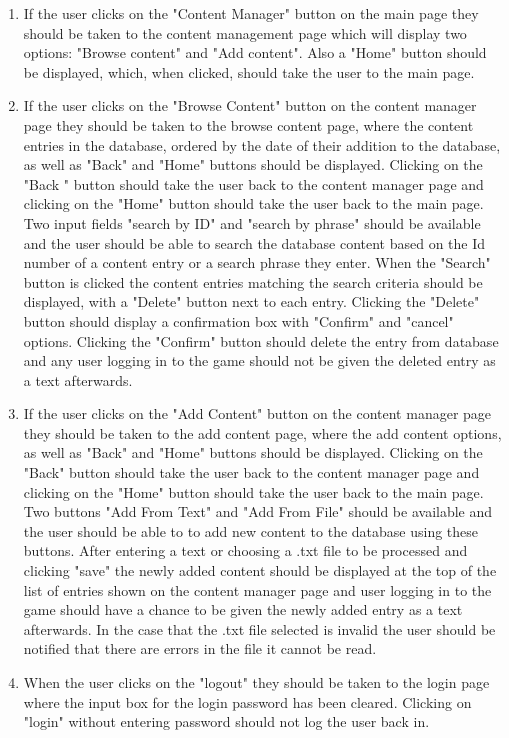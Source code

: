 \documentclass[titlepage]{article}
\begin{document}
\begin{enumerate}
	\item If the user clicks on the "Content Manager" button on the main page they should be taken to the content management page which will display two options: "Browse content" and "Add content". Also a "Home" button should be displayed, which, when clicked, should take the user to the main page.
	\item If the user clicks on the "Browse Content" button on the content manager page they should be taken to the browse content page, where the content entries in the database, ordered by the date of their addition to the database, as well as "Back" and  "Home" buttons should be displayed. Clicking on the "Back " button should take the user back to the content manager page and clicking on the "Home" button should take the user back to the main page. Two input fields "search by ID" and "search by phrase" should be available and the user should be able to search the database content based on the Id number of a content entry or a search phrase they enter. When the "Search" button is clicked the content entries matching the search criteria should be displayed, with a "Delete"  button next to each entry. Clicking the "Delete" button should display a confirmation box with "Confirm" and "cancel" options. Clicking the "Confirm" button should delete the entry from database and any user logging in to the game should not be given the deleted entry as a text afterwards.
	\item If the user clicks on the "Add Content" button on the content manager page they should be taken to the add content page, where the add content options, as well as "Back" and  "Home" buttons should be displayed. Clicking on the "Back" button should take the user back to the content manager page and clicking on the "Home" button should take the user back to the main page. Two buttons "Add From Text" and "Add From File" should be available and the user should be able to to add new content to the database using these buttons. After entering a text or choosing a .txt file to be processed and clicking "save" the newly added content should be displayed at the top of the list of entries shown on the content manager page and user logging in to the game should have a chance to be given the newly added entry as a text afterwards. In the case that the .txt file selected is invalid the user should be notified that there are errors in the file it cannot be read.
	\item When the user clicks on the "logout" they should be taken to the login page where the input box for the login password has been cleared. Clicking on "login" without entering password should not log the user back in.
\end{enumerate}
\end{document}
